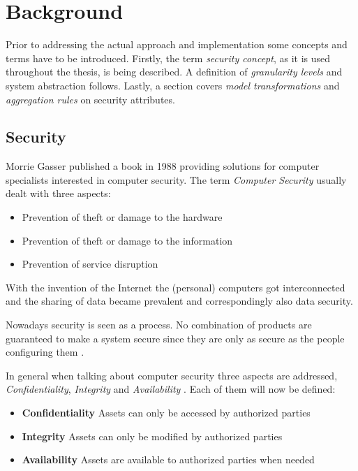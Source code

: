 
\newpage
\section{Background}
\label{sec:background}
Prior to addressing the actual approach and implementation some concepts and terms have to be introduced. Firstly, the term \textit{security concept}, as it is used throughout the thesis, is being described. A definition of \textit{granularity levels} and system abstraction follows. Lastly, a section covers \textit{model transformations} and \textit{aggregation rules} on security attributes.

\subsection{Security}

Morrie Gasser \cite{Gasser} published a book in 1988 providing solutions for computer specialists interested in computer security. The term \textit{Computer Security} usually dealt with three aspects:

\begin{itemize}
\item Prevention of theft or damage to the hardware 
\item Prevention of theft or damage to the information
\item Prevention of service disruption
\end{itemize}

With the invention of the Internet the (personal) computers got interconnected and the sharing of data became prevalent and correspondingly also data security.

Nowadays security is seen as a process. No combination of products are guaranteed to make a system secure since they are only as secure as the people configuring them \cite{vacca2012computer}. \label{sec:security}

In general when talking about computer security three aspects are addressed, \textit{Confidentiality}, \textit{Integrity} and \textit{Availability} \cite{Pfleeger:2006:SC:1177321}. Each of them will now be defined:

\begin{itemize}
\item[] \textbf{Confidentiality} Assets can only be accessed by authorized parties
\item[] \textbf{Integrity} Assets can only be modified by authorized parties
\item[] \textbf{Availability} Assets are available to authorized parties when needed
\end{itemize} 

